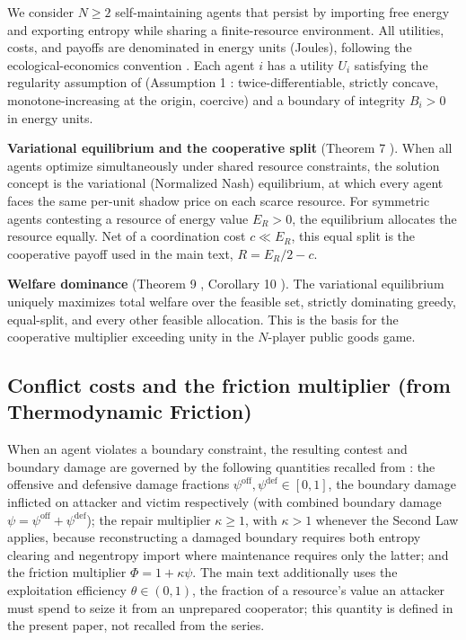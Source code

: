 \documentclass[11pt]{article}
\theoremstyle{plain}
\theoremstyle{definition}
\theoremstyle{remark}
\let\origsubsection\subsection
\renewcommand{\subsection}{\needspace{7\baselineskip}\origsubsection}
\begin{document}
We consider \(N \geq 2\) self-maintaining agents that persist by
importing free energy and exporting entropy while sharing a
finite-resource environment. All utilities, costs, and payoffs are
denominated in energy units (Joules), following the ecological-economics
convention \citep{Lotka1922, GeorgescuRoegen1971, GeorgescuRoegen1979}.
Each agent \(i\) has a utility \(U_i\) satisfying the regularity
assumption of \citep{TC-I} (Assumption 1 \citep{TC-I}:
twice-differentiable, strictly concave, monotone-increasing at the
origin, coercive) and a boundary of integrity \(B_i > 0\) in energy
units.

\textbf{Variational equilibrium and the cooperative split} (Theorem 7
\citep{TC-I}). When all agents optimize simultaneously under shared
resource constraints, the solution concept is the variational
(Normalized Nash) equilibrium, at which every agent faces the same
per-unit shadow price on each scarce resource. For symmetric agents
contesting a resource of energy value \(E_R > 0\), the equilibrium
allocates the resource equally. Net of a coordination cost
\(c \ll E_R\), this equal split is the cooperative payoff used in the
main text, \(R = E_R/2 - c\).

\textbf{Welfare dominance} (Theorem 9 \citep{TC-I}, Corollary 10
\citep{TC-I}). The variational equilibrium uniquely maximizes total
welfare over the feasible set, strictly dominating greedy, equal-split,
and every other feasible allocation. This is the basis for the
cooperative multiplier exceeding unity in the \(N\)-player public goods
game.

\subsection{Conflict costs and the friction multiplier (from
Thermodynamic
Friction)}\label{conflict-costs-and-the-friction-multiplier-from-thermodynamic-friction}

When an agent violates a boundary constraint, the resulting contest and
boundary damage are governed by the following quantities recalled from
\citep{TC-IV}: the offensive and defensive damage fractions
\(\psi^{\text{off}}, \psi^{\text{def}} \in [0,1]\), the boundary damage
inflicted on attacker and victim respectively (with combined boundary
damage \(\psi = \psi^{\text{off}} + \psi^{\text{def}}\)); the repair
multiplier \(\kappa \geq 1\), with \(\kappa > 1\) whenever the Second
Law applies, because reconstructing a damaged boundary requires both
entropy clearing and negentropy import where maintenance requires only
the latter; and the friction multiplier \(\Phi = 1 + \kappa\psi\). The
main text additionally uses the exploitation efficiency
\(\theta \in (0,1)\), the fraction of a resource's value an attacker
must spend to seize it from an unprepared cooperator; this quantity is
defined in the present paper, not recalled from the series.
\end{document}
